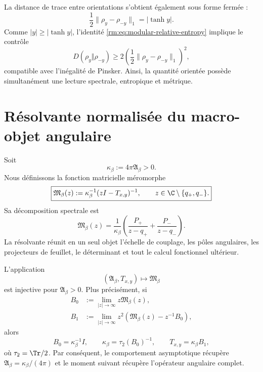 La distance de trace entre orientations s’obtient également sous forme fermée :
\begin{equation}
 \frac12\lVert\rho_y-\rho_{-y}\rVert_1=|\tanh y|.
 \label{rm:eq:modular-trace-distance}
\end{equation}
Comme \(|y|\geq|\tanh y|\), l’identité \cref{rm:eq:modular-relative-entropy} implique le contrôle
\begin{equation}
 D(\rho_y\Vert\rho_{-y})
 \geq 2\left(\frac12
 \lVert\rho_y-\rho_{-y}\rVert_1\right)^2,
 \label{rm:eq:modular-pinsker-exact-control}
\end{equation}
compatible avec l’inégalité de Pinsker. Ainsi, la quantité orientée possède simultanément une lecture spectrale, entropique et métrique.

\section{Résolvante normalisée du macro-objet angulaire}

Soit
\begin{equation}
 \kappa_\beta:=4\pi\mathfrak A_\beta>0.
 \label{rm:eq:modular-kappa-beta}
\end{equation}
Nous définissons la fonction matricielle méromorphe
\begin{equation}
 \boxed{
 \mathfrak M_\beta(z)
 :=\kappa_\beta^{-1}(zI-T_{x,y})^{-1},
 \qquad
 z\in\C\setminus\{q_+,q_-\}.}
 \label{rm:eq:modular-resolvent}
\end{equation}
Sa décomposition spectrale est
\begin{equation}
 \mathfrak M_\beta(z)
 =\frac1{\kappa_\beta}
 \left(\frac{P_+}{z-q_+}+\frac{P_-}{z-q_-}\right).
 \label{rm:eq:modular-resolvent-spectral}
\end{equation}
La résolvante réunit en un seul objet l’échelle de couplage, les pôles angulaires, les projecteurs de feuillet, le déterminant et tout le calcul fonctionnel ultérieur.

\begin{theorem}
\label{rm:thm:modular-resolvent-injective} L’application
\[
 (\mathfrak A_\beta,T_{x,y})
 \longmapsto\mathfrak M_\beta
\]
est injective pour \(\mathfrak A_\beta>0\). Plus précisément, si
\begin{align}
 B_0&:=\lim_{|z|\to\infty}z\mathfrak M_\beta(z),
 \label{rm:eq:modular-B0}\\
 B_1&:=\lim_{|z|\to\infty}z^2
 \left(\mathfrak M_\beta(z)-z^{-1}B_0\right),
 \label{rm:eq:modular-B1}
\end{align}
alors
\begin{equation}
 B_0=\kappa_\beta^{-1}I,
 \qquad
 \kappa_\beta=\tau_2(B_0)^{-1},
 \qquad
 T_{x,y}=\kappa_\beta B_1,
 \label{rm:eq:modular-reconstruct-kappa-T}
\end{equation}
où \(\tau_2=\Tr/2\). Par conséquent, le comportement asymptotique récupère \(\mathfrak A_\beta=\kappa_\beta/(4\pi)\) et le moment suivant récupère l’opérateur angulaire complet.
\end{theorem}

